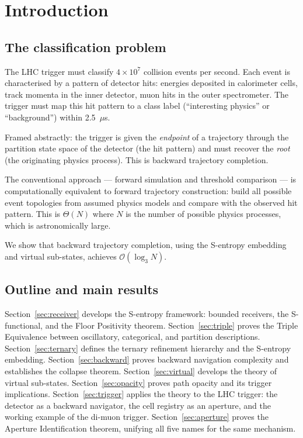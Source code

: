 \documentclass[twocolumn,10pt,a4paper]{article}
\theoremstyle{thmstyle}
\theoremstyle{definition}
\theoremstyle{remark}
\begin{document}
\tableofcontents

\section{Introduction}
\label{sec:intro}

\subsection{The classification problem}

The LHC trigger must classify $4 \times 10^7$ collision events per second.
Each event is characterised by a pattern of detector hits: energies
deposited in calorimeter cells, track momenta in the inner detector, muon
hits in the outer spectrometer. The trigger must map this hit pattern to
a class label (``interesting physics'' or ``background'') within 2.5~$\mu$s.

Framed abstractly: the trigger is given the \emph{endpoint} of a trajectory
through the partition state space of the detector (the hit pattern) and must
recover the \emph{root} (the originating physics process). This is backward
trajectory completion.

The conventional approach — forward simulation and threshold comparison — is
computationally equivalent to forward trajectory construction: build all
possible event topologies from assumed physics models and compare with the
observed hit pattern. This is $\Theta(N)$ where $N$ is the number of
possible physics processes, which is astronomically large.

We show that backward trajectory completion, using the S-entropy embedding
and virtual sub-states, achieves $\mathcal{O}(\log_3 N)$.

\subsection{Outline and main results}

Section~\ref{sec:receiver} develops the S-entropy framework: bounded
receivers, the S-functional, and the Floor Positivity theorem.
Section~\ref{sec:triple} proves the Triple Equivalence between oscillatory,
categorical, and partition descriptions.
Section~\ref{sec:ternary} defines the ternary refinement hierarchy and
the S-entropy embedding.
Section~\ref{sec:backward} proves backward navigation complexity and
establishes the collapse theorem.
Section~\ref{sec:virtual} develops the theory of virtual sub-states.
Section~\ref{sec:opacity} proves path opacity and its trigger implications.
Section~\ref{sec:trigger} applies the theory to the LHC trigger: the
detector as a backward navigator, the cell registry as an aperture,
and the working example of the di-muon trigger.
Section~\ref{sec:aperture} proves the Aperture Identification theorem,
unifying all five names for the same mechanism.
\end{document}
